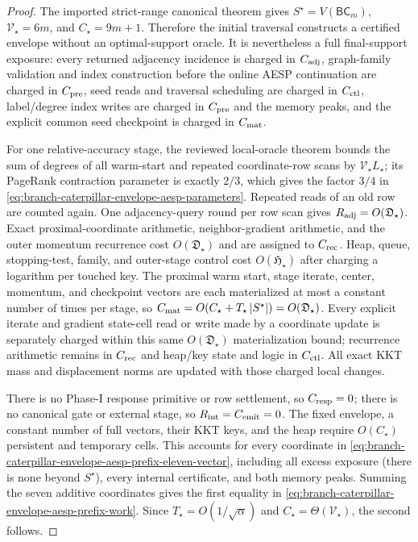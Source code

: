 \begin{proof}
The imported strict-range canonical theorem gives
$S^\star=V(\mathsf{BC}_m)$, $\mathcal V_\star=6m$, and $C_\star=9m+1$.
Therefore the initial traversal constructs a certified envelope without an
optimal-support oracle.  It is nevertheless a full final-support exposure:
every returned adjacency incidence is charged in $C_{\rm adj}$, graph-family
validation and index construction before the online AESP continuation are
charged in $C_{\rm pre}$, seed reads and traversal scheduling are charged in
$C_{\rm ctl}$, label/degree index writes are charged in $C_{\rm pre}$ and the
memory peaks, and the explicit common seed checkpoint is charged in
$C_{\rm mat}$.

For one relative-accuracy stage, the reviewed local-oracle theorem bounds the
sum of degrees of all warm-start and repeated coordinate-row scans by
$\mathcal V_\star L_\star$; its PageRank contraction parameter is exactly
$2/3$, which gives the factor $3/4$ in
\cref{eq:branch-caterpillar-envelope-aesp-parameters}.  Repeated reads of an
old row are counted again.  One adjacency-query round per row scan gives
$R_{\rm adj}=O(\mathfrak D_\star)$.  Exact proximal-coordinate arithmetic,
neighbor-gradient arithmetic, and the outer momentum recurrence cost
$O(\mathfrak D_\star)$ and are assigned to $C_{\rm rec}$.
Heap, queue, stopping-test, family, and outer-stage control cost
$O(\mathfrak H_\star)$ after charging a logarithm per touched key.  The
proximal warm start, stage iterate, center, momentum, and checkpoint vectors
are each materialized at most a constant number of times per stage, so
$C_{\rm mat}=O(C_\star+T_\star\left\lvert S^\star \right\rvert)
 =O(\mathfrak D_\star)$.  Every explicit iterate and gradient state-cell read
or write made by a coordinate update is separately charged within this same
$O(\mathfrak D_\star)$ materialization bound; recurrence arithmetic
remains in $C_{\rm rec}$ and heap/key state and logic in $C_{\rm ctl}$.  All
exact KKT mass and displacement norms are updated with those charged local
changes.

There is no Phase-I response primitive or row settlement, so $C_{\rm resp}=0$;
there is no canonical gate or external stage, so $R_{\rm int}=C_{\rm emit}=0$.
The fixed envelope, a constant number of full vectors, their KKT keys, and the
heap require $O(C_\star)$ persistent and temporary cells.  This accounts for
every coordinate in
\cref{eq:branch-caterpillar-envelope-aesp-prefix-eleven-vector}, including
all excess exposure (there is none beyond $S^\star$), every internal
certificate, and both memory peaks.  Summing the seven additive coordinates
gives the first equality in
\cref{eq:branch-caterpillar-envelope-aesp-prefix-work}.  Since
$T_\star=O(1/\sqrt\alpha)$ and $C_\star=\Theta(\mathcal V_\star)$, the second
follows.


\end{proof}
